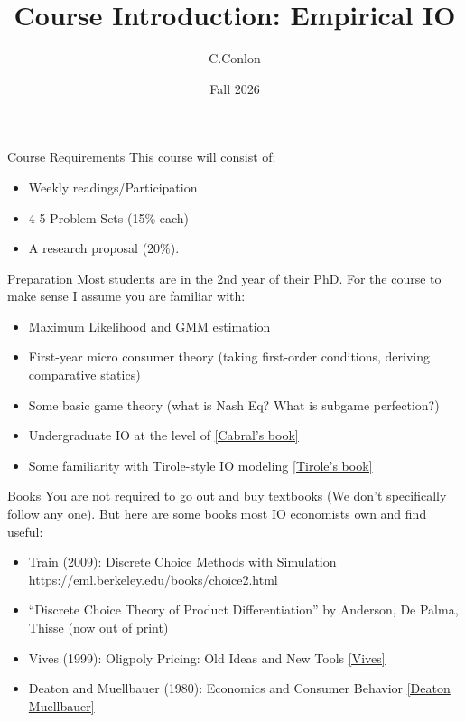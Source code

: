\documentclass[aspectratio=169,11pt]{beamer}
\title [Course Intro]{Course Introduction: Empirical IO}
\author{C.Conlon}
\institute{Grad IO }
\date{Fall 2026}
\begin{document}
\begin{frame}
\titlepage
\end{frame}

\begin{frame}{Course Requirements}
This course will consist of:
\begin{itemize}
    \item Weekly readings/Participation
    \item 4-5 Problem Sets (15\% each)
    \item A research proposal (20\%).
\end{itemize}
\end{frame}


\begin{frame}{Preparation}
Most students are in the 2nd year of their PhD. For the course to make sense I assume you are familiar with:
\begin{itemize}
    \item Maximum Likelihood and GMM estimation
    \item First-year micro consumer theory (taking first-order conditions, deriving comparative statics)
    \item Some basic game theory (what is Nash Eq? What is subgame perfection?)
    \item Undergraduate IO at the level of \href{https://www.amazon.com/Introduction-Industrial-Organization-MIT-Press/dp/0262035944}{[Cabral's book]}
    \item Some familiarity with Tirole-style IO modeling \href{https://www.amazon.com/Theory-Industrial-Organization-MIT-Press/dp/0262200716/}{[Tirole's book]}
\end{itemize}
\end{frame}



\begin{frame}{Books}
You are not required to go out and buy textbooks (We don't specifically follow any one). But here are some books most IO economists own and find useful:
\begin{itemize}
    \item Train (2009): Discrete Choice Methods with Simulation \url{https://eml.berkeley.edu/books/choice2.html}
    \item ``Discrete Choice Theory of Product Differentiation'' by Anderson, De Palma, Thisse (now out of print)
    \item Vives (1999): Oligpoly Pricing: Old Ideas and New Tools \href{https://www.amazon.com/Oligopoly-Pricing-Old-Ideas-Tools/dp/026272040X}{[Vives]}
    \item Deaton and Muellbauer (1980): Economics and Consumer Behavior \href{https://www.amazon.com/Economics-Consumer-Behavior-Angus-Deaton/dp/0521296765}{[Deaton Muellbauer]}
\end{itemize}
\end{frame}
\end{document}
